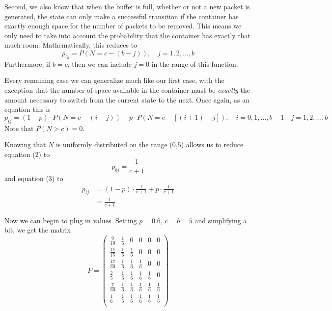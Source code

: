 \documentclass{article}
\begin{document}
Second, we also know that when the buffer is full, whether or not a new packet
is generated, the state can only make a successful transition if the container
has exactly enough space for the number of packets to be removed. This means we
only need to take into account the probability that the container has exactly
that much room. Mathematically, this reduces to
\begin{equation}
  p_{bj} = P( N = c - (b - j) ), \quad j = 1,2,\ldots,b
\end{equation}
Furthermore, if $b = c$, then we can include $j = 0$ in the range of this
function.

Every remaining case we can generalize much like our first case, with the
exception that the number of space available in the container must be
\emph{exactly} the amount necessary to switch from the current state to the
next. Once again, as an equation this is
\begin{equation}
  p_{ij} = (1 - p)\cdot P( N = c - (i - j) ) + p\cdot P( N = c - [(i + 1) - j]
  ), \quad i=0,1,\ldots,b-1 \quad j=1,2,\ldots,b
\end{equation}
Note that $P( N > c ) = 0$.

Knowing that $N$ is uniformly distributed on the range (0,5) allows us to
reduce equation (2) to
\begin{equation}
  p_{bj} = \frac{1}{c + 1}
\end{equation}
and equation (3) to
\begin{align}
  p_{ij} &= (1 - p)\cdot\frac{1}{c + 1} + p\cdot\frac{1}{c + 1} \nonumber \\
  &= \frac{1}{c + 1}
\end{align}

Now we can begin to plug in values. Setting $p = 0.6$, $c = b = 5$ and
simplifying a bit, we get the matrix
\[
  P =
\begin{pmatrix}
  \frac{9}{10} & \frac{1}{6} & 0 & 0 & 0 & 0 \\[6pt]
  \frac{11}{15} & \frac{1}{6} & \frac{1}{6} & 0 & 0 & 0 \\[6pt]
  \frac{17}{30} & \frac{1}{6} & \frac{1}{6} & \frac{1}{6} & 0 & 0 \\[6pt]
  \frac{2}{5} & \frac{1}{6} & \frac{1}{6} & \frac{1}{6} & \frac{1}{6} & 0
  \\[6pt]
  \frac{7}{30} & \frac{1}{6} & \frac{1}{6} & \frac{1}{6} & \frac{1}{6} &
  \frac{1}{6} \\[6pt]
  \frac{1}{6} & \frac{1}{6} & \frac{1}{6} & \frac{1}{6} & \frac{1}{6} &
  \frac{1}{6} \\[6pt]
\end{pmatrix}
\]
\end{document}
